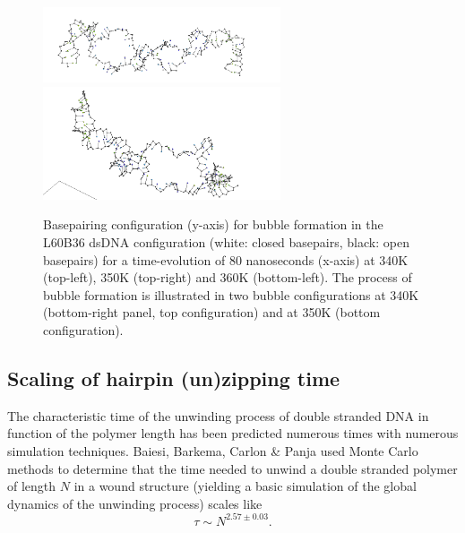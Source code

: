 \begin{figure}[hbt] \begin{minipage}{7cm}
 \end{minipage} \begin{minipage}{7cm}  \end{minipage}
\begin{minipage}{8cm}
 \end{minipage} \begin{minipage}{6cm}
\includegraphics[width=7cm]{images/L60B36_bubble2.png}\\
\includegraphics[width=7cm]{images/L60B36_bubble1.png} \end{minipage}
\begin{center}
\caption{Basepairing configuration (y-axis) for bubble formation in the L60B36 dsDNA configuration (white: closed basepairs, black: open basepairs) for a time-evolution of 80 nanoseconds (x-axis) at 340K (top-left), 350K (top-right) and 360K (bottom-left). The process of bubble formation is illustrated in two bubble configurations at 340K (bottom-right panel, top configuration) and at 350K (bottom configuration). }\label{L60B36_configs}
\end{center}
\end{figure}




\subsection{Scaling of hairpin (un)zipping time}
The characteristic time of the unwinding process of double stranded DNA in function of the polymer length has been predicted numerous times with numerous simulation techniques.
Baiesi, Barkema, Carlon \& Panja \cite{carlon2010unwinding} used Monte Carlo methods to determine that the time needed to unwind a double stranded polymer of length $N$ in a wound structure (yielding a basic simulation of the global dynamics of the unwinding process) scales like
\begin{equation}
\tau \sim N^{2.57\pm 0.03}.
\end{equation}

